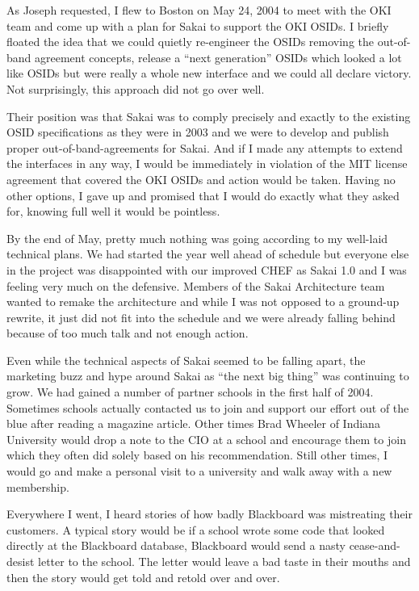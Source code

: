 \documentclass[12pt]{book}
\begin{document}
As Joseph requested, I flew to Boston on May 24, 2004 to meet with the OKI
team and come up with a plan for Sakai to support the OKI OSIDs.  I briefly
floated the idea that we could quietly re-engineer the OSIDs removing the
out-of-band agreement concepts, release a ``next generation'' OSIDs which
looked a lot like OSIDs but were really a whole new interface and we
could all declare victory.  Not surprisingly, this approach did not go
over well.

Their position was that Sakai was to comply precisely and exactly to the
existing OSID specifications as they were in 2003 and
we were to develop and publish proper out-of-band-agreements
for Sakai.  And if I made any attempts to extend
the interfaces in any way, I would be immediately in violation of the
MIT license agreement that covered the OKI OSIDs and action would be taken.
Having no other options, I gave up and promised that I would do
exactly what they asked for, knowing full well it would be pointless.

By the end of May, pretty much nothing was going according to
my well-laid technical plans.  We had started the year well
ahead of schedule but everyone else in the project was
disappointed with our improved CHEF as Sakai 1.0 and I was
feeling very much on the defensive.  Members of the Sakai
Architecture team wanted to remake the architecture and while
I was not opposed to a ground-up rewrite, it just did not
fit into the schedule and we were already falling behind
because of too much talk and not enough action.

Even while the technical aspects of Sakai seemed to be falling
apart, the marketing buzz and hype around Sakai as ``the next
big thing'' was continuing to grow.   We had gained a number of
partner schools in the first half of 2004.  Sometimes schools
actually contacted us to join and support our effort out of the blue
after reading a magazine article.  Other
times Brad Wheeler of Indiana University would drop a note to the
CIO at a school and encourage them to
join which they often did solely based on his recommendation.
Still other times, I would go and make a personal visit to a
university and walk away with a new membership.

Everywhere I went, I heard stories of how badly
Blackboard was mistreating their customers.  A typical story
would be if a school wrote some code that looked directly
at the Blackboard database, Blackboard would send a nasty
cease-and-desist letter to the school. The letter would leave a
bad taste in their mouths and then the story would get
told and retold over and over.
\end{document}
